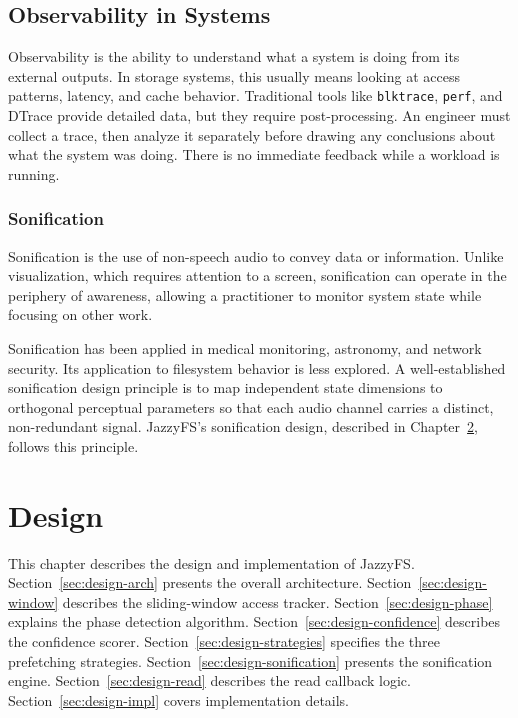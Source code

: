 \documentclass[12pt]{report}
\begin{document}
\section{Observability in Systems}
\label{sec:bg-obs}

Observability is the ability to understand what a system is doing from its
external outputs. In storage systems, this usually means looking at access
patterns, latency, and cache behavior. Traditional tools like
\texttt{blktrace}, \texttt{perf}, and DTrace provide detailed data, but
they require post-processing. An engineer must collect a trace, then
analyze it separately before drawing any conclusions about what the system
was doing. There is no immediate feedback while a workload is running.

\subsection{Sonification}

Sonification is the use of non-speech audio to convey data or
information. Unlike visualization, which requires
attention to a screen, sonification can operate in the periphery of awareness,
allowing a practitioner to monitor system state while focusing on other work.

Sonification has been applied in medical monitoring, astronomy, and network
security. Its application to filesystem
behavior is less explored. A well-established sonification design principle
is to map independent state dimensions to orthogonal perceptual parameters
so that each audio channel carries a distinct, non-redundant signal.
JazzyFS's sonification design, described in Chapter~\ref{ch:design},
follows this principle.


\chapter{Design}
\label{ch:design}

This chapter describes the design and implementation of JazzyFS.
Section~\ref{sec:design-arch} presents the overall architecture.
Section~\ref{sec:design-window} describes the sliding-window access tracker.
Section~\ref{sec:design-phase} explains the phase detection algorithm.
Section~\ref{sec:design-confidence} describes the confidence scorer.
Section~\ref{sec:design-strategies} specifies the three prefetching strategies.
Section~\ref{sec:design-sonification} presents the sonification engine.
Section~\ref{sec:design-read} describes the read callback logic.
Section~\ref{sec:design-impl} covers implementation details.
\end{document}
